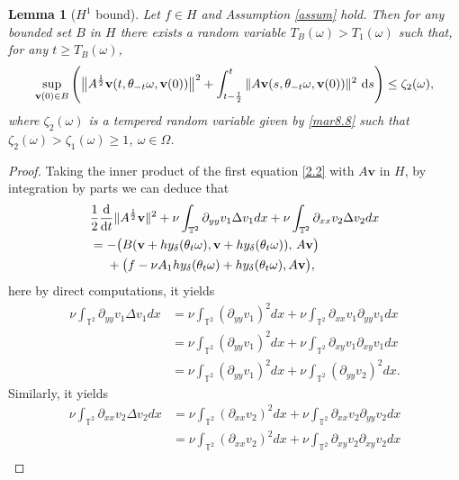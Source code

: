 \documentclass{elsarticle}
\newtheorem{lemma}[theorem]{Lemma}
\theoremstyle{definition}
\numberwithin{equation}{section}
\renewcommand{\d}{{\rm{d}}}
\begin{document}
\begin{lemma}[$H^1$ bound] \label{lem:H1bound}
Let  $f\in H$ and Assumption \ref{assum} hold.
Then for any bounded set $ B$ in $ H$ there exists a random variable $ T_B(\omega)>T_1(\omega)$ such that,  for any $t\geq T_B(\omega)$,
\begin{align*}
\sup_{\textbf{v}(0)\in B} \left( \big\|A^{\frac12}\textbf{v}(t,\theta_{-t}\omega,\textbf{v}(0))  \big\|^2 + \int_{t-\frac 12 }^t \|A\textbf{v}(s,\theta_{-t}\omega,\textbf{v}(0))\|^2  \ \d s\right)
\leq  \zeta_2(\omega),
\end{align*}
where $\zeta_2(\omega)$  is a tempered random variable given by \eqref{mar8.8} such that $\zeta_2(\omega) > \zeta_1(\omega)\geq 1$, $ \omega\in\Omega$.
\end{lemma}
\begin{proof}
Taking the inner product of the first equation   \eqref{2.2} with $A\textbf{v}$ in $H$, by integration by parts we can deduce that
\begin{align}\label{4.6}
&\frac12\frac{\d}{\d t}\|A^{\frac12}\textbf{v}\|^2+ \nu \int_{\mathbb{T}^2}\partial_{yy}v_1\Delta v_1dx+\nu \int_{\mathbb{T}^2}\partial_{xx}v_2\Delta v_2dx\nonumber\\
&=-\big(B(\textbf{v}+hy_{\delta}(\theta_t\omega),\textbf{v}+hy_{\delta}(\theta_t\omega)),\, A\textbf{v} \big)\nonumber\\
&\quad \ +\big(f-\nu A_1hy_{\delta}(\theta_t\omega) +hy_{\delta}(\theta_t\omega),A\textbf{v} \big),
\end{align}
here by direct computations, it yields
\begin{align}\label{3.10}
\nu \int_{\mathbb{T}^2}\partial_{yy}v_1\Delta v_1dx&=\nu \int_{\mathbb{T}^2}(\partial_{yy}v_1)^2dx
+\nu \int_{\mathbb{T}^2}\partial_{xx}v_1\partial_{yy}v_1dx\nonumber\\
&=\nu \int_{\mathbb{T}^2}(\partial_{yy}v_1)^2dx
+\nu \int_{\mathbb{T}^2}\partial_{xy}v_1\partial_{xy}v_1dx\nonumber\\
&=\nu \int_{\mathbb{T}^2}(\partial_{yy}v_1)^2dx
+\nu \int_{\mathbb{T}^2}(\partial_{yy}v_2)^2dx.
\end{align}
Similarly, it yields
\begin{align}\label{3.11}
\nu \int_{\mathbb{T}^2}\partial_{xx}v_2\Delta v_2dx&=\nu \int_{\mathbb{T}^2}(\partial_{xx}v_2)^2dx
+\nu \int_{\mathbb{T}^2}\partial_{xx}v_2\partial_{yy}v_2dx\nonumber\\
&=\nu \int_{\mathbb{T}^2}(\partial_{xx}v_2)^2dx
+\nu \int_{\mathbb{T}^2}\partial_{xy}v_2\partial_{xy}v_2dx\nonumber\\

\end{align}
\end{proof}
\end{document}
